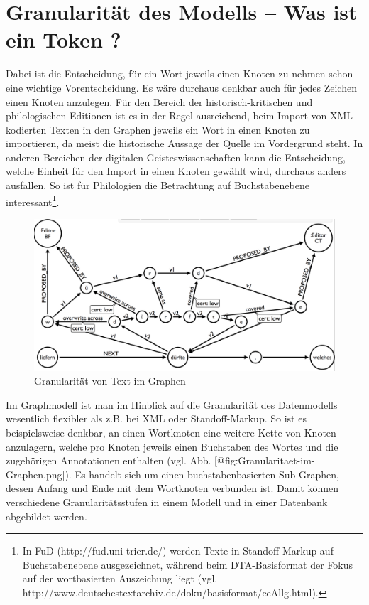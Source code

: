 \documentclass[ngerman,]{scrreprt}
\begin{document}
\section{Granularität des Modells -- Was ist ein Token ?}\label{granularituxe4t-des-modells-was-ist-ein-token}

Dabei ist die Entscheidung, für ein Wort jeweils einen Knoten zu nehmen schon eine wichtige Vorentscheidung. Es wäre durchaus denkbar auch für jedes Zeichen einen Knoten anzulegen. Für den Bereich der historisch-kritischen und philologischen Editionen ist es in der Regel ausreichend, beim Import von XML-kodierten Texten in den Graphen jeweils ein Wort in einen Knoten zu importieren, da meist die historische Aussage der Quelle im Vordergrund steht. In anderen Bereichen der digitalen Geisteswissenschaften kann die Entscheidung, welche Einheit für den Import in einen Knoten gewählt wird, durchaus anders ausfallen. So ist für Philologien die Betrachtung auf Buchstabenebene interessant\footnote{In FuD (http://fud.uni-trier.de/) werden Texte in Standoff-Markup auf Buchstabenebene ausgezeichnet, während beim DTA-Basisformat der Fokus auf der wortbasierten Auszeichung liegt (vgl. http://www.deutschestextarchiv.de/doku/basisformat/eeAllg.html).}.

\begin{figure}
\centering
\includegraphics{Bilder/Granularitaet-im-Graphen.png}
\caption{Granularität von Text im Graphen}\label{fig:Granularitaet-im-Graphen.png}
\end{figure}

Im Graphmodell ist man im Hinblick auf die Granularität des Datenmodells wesentlich flexibler als z.B. bei XML oder Standoff-Markup. So ist es beispielsweise denkbar, an einen Wortknoten eine weitere Kette von Knoten anzulagern, welche pro Knoten jeweils einen Buchstaben des Wortes und die zugehörigen Annotationen enthalten (vgl. Abb. {[}@fig:Granularitaet-im-Graphen.png{]}). Es handelt sich um einen buchstabenbasierten Sub-Graphen, dessen Anfang und Ende mit dem Wortknoten verbunden ist. Damit können verschiedene Granularitätsstufen in einem Modell und in einer Datenbank abgebildet werden.
\end{document}

